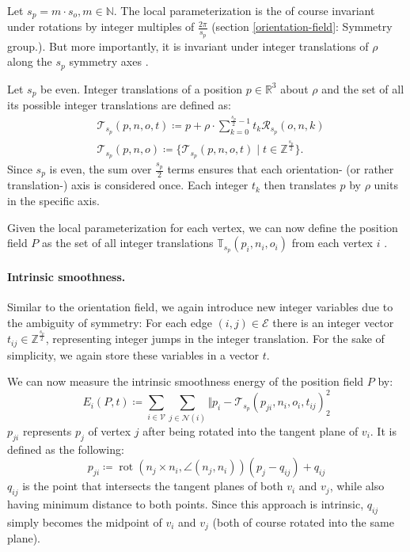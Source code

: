 \documentclass{ACGSeminar}
\DeclareMathOperator{\rot}{rot}
\begin{document}
Let $s_p = m \cdot s_o, m \in \mathbb{N}$. The local parameterization is the of course invariant under rotations by integer multiples of $\frac{2\pi}{s_p}$ (section \ref{orientation-field}: Symmetry group.). But more importantly, it is invariant under integer translations of $\rho$ along the $s_p$ symmetry axes \cite{jakob2015instant}.\bigskip

Let $s_p$ be even. Integer translations of a position $p \in \mathbb{R}^3$ about $\rho$ and the set of all its possible integer translations are defined as:
\begin{equation*}
\begin{split}
	& \mathcal{T}_{s_p}(p,n,o,t) \coloneqq p + \rho \cdot \sum_{k=0}^{\frac{s_p}{2}-1} t_k \mathcal{R}_{s_p}(o,n,k)\\
	& \mathcal{T}_{s_p}(p,n,o) \coloneqq \{\mathcal{T}_{s_p}(p,n,o,t) \mid t \in \mathbb{Z}^{\frac{s_p}{2}}\}.
\end{split}
\end{equation*}
Since $s_p$ is even, the sum over $\frac{s_p}{2}$ terms ensures that each orientation- (or rather translation-) axis is considered once. Each integer $t_k$ then translates $p$ by $\rho$ units in the specific axis.

Given the local parameterization for each vertex, we can now define the position field $P$ as the set of all integer translations $\mathbb{T}_{s_p}(p_i, n_i, o_i)$ from each vertex $i$ \cite{jakob2015instant}.

\paragraph{Intrinsic smoothness.}
Similar to the orientation field, we again introduce new integer variables due to the ambiguity of symmetry: For each edge $(i,j) \in \mathcal{E}$ there is an integer vector $t_{ij} \in \mathbb{Z}^{\frac{s_p}{2}}$, representing integer jumps in the integer translation. For the sake of simplicity, we again store these variables in a vector $t$.\bigskip

We can now measure the intrinsic smoothness energy of the position field $P$ by:
\begin{equation*}
	E_i(P,t) \coloneqq \sum_{i \in \mathcal{V}} \sum_{j \in \mathcal{N}(i)} \Vert p_i - \mathcal{T}_{s_p}(p_{ji}, n_i, o_i, t_{ij})^2_2
\end{equation*}
$p_{ji}$ represents $p_j$ of vertex $j$ after being rotated into the tangent plane of $v_i$. It is defined as the following:
\begin{equation*}
	p_{ji} \coloneqq \rot(n_j \times n_i, \angle(n_j, n_i)) (p_j - q_{ij}) + q_{ij}
\end{equation*}
$q_{ij}$ is the point that intersects the tangent planes of both $v_i$ and $v_j$, while also having minimum distance to both points. Since this approach is intrinsic, $q_{ij}$ simply becomes the midpoint of $v_i$ and $v_j$ (both of course rotated into the same plane).\bigskip
\end{document}
